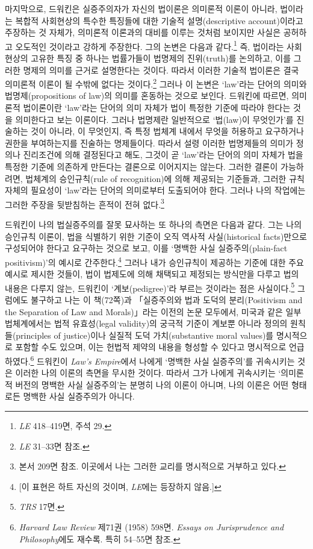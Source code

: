 마지막으로, 드워킨은 실증주의자가 자신의 법이론은 의미론적 이론이
아니라, 법이라는 복합적 사회현상의 특수한 특징들에 대한 기술적
설명(descriptive account)이라고 주장하는 것 자체가, 의미론적 이론과의
대비를 이루는 것처럼 보이지만 사실은 공허하고 오도적인 것이라고 강하게
주장한다. 그의 논변은 다음과 같다.\footnote{\emph{LE} 418--419면, 주석
  29.} 즉, 법이라는 사회현상의 고유한 특징 중 하나는 법률가들이 법명제의
진위(truth)를 논의하고, 이를 그러한 명제의 의미를 근거로 설명한다는
것이다. 따라서 이러한 기술적 법이론은 결국 의미론적 이론이 될 수밖에
없다는 것이다.\footnote{\emph{LE} 31--33면 참조.} 그러나 이 논변은
`law'라는 단어의 의미와 법명제(propositions of law)의 의미를 혼동하는
것으로 보인다. 드워킨에 따르면, 의미론적 법이론이란 `law'라는 단어의
의미 자체가 법이 특정한 기준에 따라야 한다는 것을 의미한다고 보는
이론이다. 그러나 법명제란 일반적으로 `법(law)이 무엇인가'를 진술하는
것이 아니라, 이 무엇인지, 즉 특정 법체계 내에서
무엇을 허용하고 요구하거나 권한을 부여하는지를 진술하는 명제들이다.
따라서 설령 이러한 법명제들의 의미가 정의나 진리조건에 의해 결정된다고
해도, 그것이 곧 `law'라는 단어의 의미 자체가 법을 특정한 기준에 의존하게
만든다는 결론으로 이어지지는 않는다. 그러한 결론이 가능하려면, 법체계의
승인규칙(rule of recognition)에 의해 제공되는 기준들과, 그러한 규칙
자체의 필요성이 `law'라는 단어의 의미로부터 도출되어야 한다. 그러나 나의
작업에는 그러한 주장을 뒷받침하는 흔적이 전혀 없다.\footnote{본서 209면
  참조. 이곳에서 나는 그러한 교리를 명시적으로 거부하고 있다.}

드워킨이 나의 법실증주의를 잘못 묘사하는 또 하나의 측면은 다음과 같다.
그는 나의 승인규칙 이론이, 법을 식별하기 위한 기준이 오직 역사적
사실(historical facts)만으로 구성되어야 한다고 요구하는 것으로 보고,
이를 `명백한 사실 실증주의(plain-fact positivism)'의 예시로
간주한다.\footnote{{[}이 표현은 하트 자신의 것이며, \emph{LE}에는
  등장하지 않음.{]}} 그러나 내가 승인규칙이 제공하는 기준에 대한 주요
예시로 제시한 것들이, 법이 법제도에 의해 채택되고 제정되는 방식만을
다루고 법의 내용은 다루지 않는, 드워킨이 `계보(pedigree)'라 부르는
것이라는 점은 사실이다.\footnote{\emph{TRS} 17면.} 그럼에도 불구하고
나는 이 책(72쪽)과 「실증주의와 법과 도덕의 분리(Positivism and the
Separation of Law and Morals)」라는 이전의 논문 모두에서, 미국과 같은
일부 법체계에서는 법적 유효성(legal validity)의 궁극적 기준이 계보뿐
아니라 정의의 원칙들(principles of justice)이나 실질적 도덕
가치(substantive moral values)를 명시적으로 포함할 수도 있으며, 이는
헌법적 제약의 내용을 형성할 수 있다고 명시적으로 언급하였다.\footnote{\emph{Harvard
  Law Review} 제71권 (1958) 598면. \emph{Essays on Jurisprudence and
  Philosophy}에도 재수록. 특히 54--55면 참조.} 드워킨이 \emph{Law's
Empire}에서 나에게 `명백한 사실 실증주의'를 귀속시키는 것은 이러한 나의
이론의 측면을 무시한 것이다. 따라서 그가 나에게 귀속시키는 `의미론적
버전의 명백한 사실 실증주의'는 분명히 나의 이론이 아니며, 나의 이론은
어떤 형태로든 명백한 사실 실증주의가 아니다.

